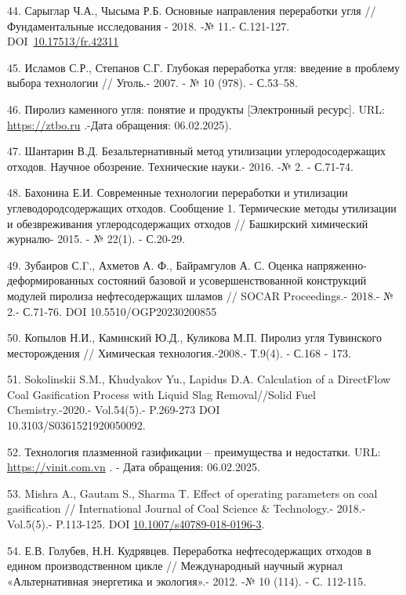 \begin{references}
44. Сарыглар Ч.А., Чысыма Р.Б. Основные направления переработки угля //
Фундаментальные иссле\-дования - 2018. -№ 11.- С.121-127.
DOI~\href{https://doi.org/10.17513/fr.42311}{10.17513/fr.42311}

45. Исламов С.Р., Степанов С.Г. Глубокая переработка угля: введение в
проблему выбора технологии // Уголь.- 2007. - № 10 (978). - С.53--58.

46. Пиролиз каменного угля: понятие и продукты {[}Электронный ресурс{]}.
URL:
\href{https://ztbo.ru/o-tbo/stati/piroliz/piroliz-kamennogo-uglya-ponyatie-i-produkti}{https://ztbo.ru} .-Дата
обращения: 06.02.2025).

47. Шантарин В.Д. Безальтернативный метод утилизации углеродосодержащих
отходов. Научное обо­зрение. Технические науки.- 2016. -№ 2. - С.71-74.

48. Бахонина Е.И. Современные технологии переработки и утилизации
углеводородсодержащих отходов. Сообщение 1. Термические методы
утилизации и обезвреживания углеродсодержащих отходов // Башкирский
хими­ческий журналю- 2015. - № 22(1). - С.20-29.

49. Зубаиров С.Γ., Ахметов А. Ф., Байрамгулов А. С. Оценка
напряженно-деформированных состояний базовой и усовершенствованной
конструкций модулей пиролиза нефтесодержащих шламов // SOCAR
Proceedings.- 2018.- № 2.- С.71-76. DOI 10.5510/OGP20230200855

50. Копылов Н.И., Каминский Ю.Д., Куликова М.П. Пиролиз угля Тувинского
месторождения // Химическая технология.-2008.- Т.9(4). - С.168 - 173.

51. Sokolinskii S.M., Khudyakov Yu., Lapidus D.A. Calculation of a
DirectFlow Coal Gasification Process with Liquid Slag Removal//Solid
Fuel Chemistry.-2020.- Vol.54(5).- P.269-273 DOI\\
10.3103/S0361521920050092.

52. Технология плазменной газификации -- преимущества и недостатки. URL:
\href{https://vinit.com.vn/ru/технология-плазменной-газификации-п/}{https://vinit.com.vn} . -
Дата обращения: 06.02.2025.

53. Mishra A., Gautam S., Sharma T. Effect of operating parameters on
coal gasification // International Journal of Coal Science \&
Technology.- 2018.- Vol.5(5).- P.113-125. DOI
\href{http://dx.doi.org/10.1007/s40789-018-0196-3}{10.1007/s40789-018-0196-3}.

54. Е.В. Голубев, Н.Н. Кудрявцев. Переработка нефтесодержащих отходов в
едином производственном цикле // Международный научный журнал
«Альтернативная энергетика и экология».- 2012. -№ 10 (114). - С.
112-115.


\end{references}
